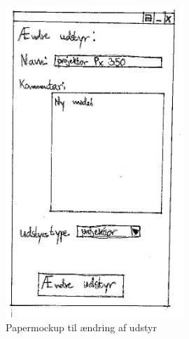 \begin{figure}[h!]
  \centering
    \includegraphics[width=0.6\textwidth]{Appendix/GUI-Prototype/PaperMockup/AendreUdstyr_001}
  \caption{Papermockup til ændring af udstyr}
\label{App_GUI_paper_AendreUdstyr}
\end{figure}


